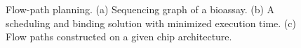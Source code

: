 \begin{figure}[t]
    \centering
    \label{ta}
    \label{tb}
    \label{tc}
	  \caption{Flow-path planning. (a) Sequencing graph of a bioassay. (b) A scheduling and binding solution with minimized execution time. (c) Flow paths constructed on a given chip architecture.}
	  \label{fig:motivation}
\vspace{-0.5cm}
\end{figure}


